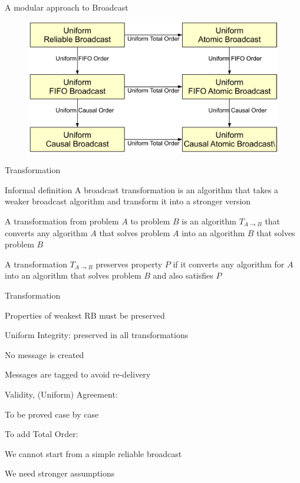 \begin{frame}{A modular approach to Broadcast}

\begin{figure}
	\includegraphics[width=\textwidth]{rb-modular-urb1}
\end{figure}

\end{frame}



\begin{frame}{Transformation}
	
\begin{block}{Informal definition}
A broadcast transformation is an algorithm that takes a weaker broadcast 
algorithm and transform it into a stronger version
\end{block}

\begin{definition}[Transformation]
A \alert{transformation} from problem $A$ to problem $B$ is an algorithm $T_{A \rightarrow B}$ that converts 
any algorithm $A$ that solves problem $A$ into an algorithm $B$ that
solves problem $B$
\end{definition}

\begin{definition}[Preservation]
A transformation $T_{A \rightarrow B}$ \alert{preserves} property $P$ if it
converts any algorithm for $A$ into an algorithm that solves problem $B$ and
also satisfies $P$
\end{definition}
	
\end{frame}

\begin{frame}{Transformation}
\BIL
\item Properties of weakest RB must be preserved
  \BI
  \item \alert{Uniform Integrity}: preserved in all transformations
  \BI
    \item No message is created
    \item Messages are tagged to avoid re-delivery
  \EI
  \item \alert{Validity}, \alert{(Uniform) Agreement}: 
  \BI
    \item To be proved case by case
  \EI
  \EI
\item  To add Total Order:
  \BI
  \item We cannot start from a simple reliable broadcast
  \item We need stronger assumptions
  \EI
\EIL
\end{frame}

